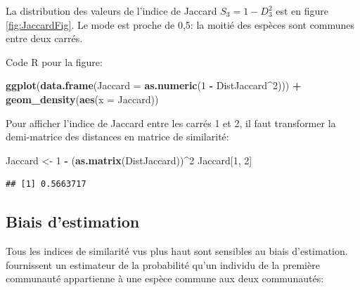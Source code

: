 \documentclass[
  11pt,
  french,
  a4paper,
  extrafontsizes,onecolumn,openright
  ]{memoir}
\newenvironment{Shaded}{\begin{snugshade}}{\end{snugshade}}
\newcommand{\DataTypeTok}[1]{\textcolor[rgb]{0.13,0.29,0.53}{#1}}
\newcommand{\DecValTok}[1]{\textcolor[rgb]{0.00,0.00,0.81}{#1}}
\newcommand{\KeywordTok}[1]{\textcolor[rgb]{0.13,0.29,0.53}{\textbf{#1}}}
\newcommand{\NormalTok}[1]{#1}
\newcommand{\OperatorTok}[1]{\textcolor[rgb]{0.81,0.36,0.00}{\textbf{#1}}}
\newcommand{\StringTok}[1]{\textcolor[rgb]{0.31,0.60,0.02}{#1}}
\begin{document}
\normalsize

La distribution des valeurs de l'indice de Jaccard \(S_3=1-D_3^2\) est en figure \ref{fig:JaccardFig}.
Le mode est proche de 0,5: la moitié des espèces sont communes entre deux carrés.

Code R pour la figure:

\scriptsize

\begin{Shaded}
\begin{Highlighting}[]
\KeywordTok{ggplot}\NormalTok{(}\KeywordTok{data.frame}\NormalTok{(}\DataTypeTok{Jaccard =} \KeywordTok{as.numeric}\NormalTok{(}\DecValTok{1} \OperatorTok{-}\StringTok{ }\NormalTok{DistJaccard}\OperatorTok{^}\DecValTok{2}\NormalTok{))) }\OperatorTok{+}\StringTok{ }
\StringTok{    }\KeywordTok{geom_density}\NormalTok{(}\KeywordTok{aes}\NormalTok{(}\DataTypeTok{x =}\NormalTok{ Jaccard))}
\end{Highlighting}
\end{Shaded}

\normalsize

Pour afficher l'indice de Jaccard entre les carrés 1 et 2, il faut transformer la demi-matrice des distances en matrice de similarité:

\scriptsize

\begin{Shaded}
\begin{Highlighting}[]
\NormalTok{Jaccard <-}\StringTok{ }\DecValTok{1} \OperatorTok{-}\StringTok{ }\NormalTok{(}\KeywordTok{as.matrix}\NormalTok{(DistJaccard))}\OperatorTok{^}\DecValTok{2}
\NormalTok{Jaccard[}\DecValTok{1}\NormalTok{, }\DecValTok{2}\NormalTok{]}
\end{Highlighting}
\end{Shaded}

\begin{verbatim}
## [1] 0.5663717
\end{verbatim}

\normalsize

\hypertarget{biais-destimation}{%
\subsection{Biais d'estimation}\label{biais-destimation}}

Tous les indices de similarité vus plus haut sont sensibles au biais d'estimation.
\textcite{Chao2004a} fournissent un estimateur de la probabilité qu'un individu de la première communauté appartienne à une espèce commune aux deux communautés:
\end{document}
